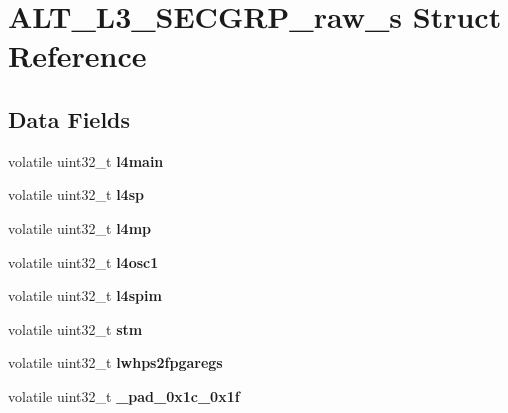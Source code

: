 \hypertarget{structALT__L3__SECGRP__raw__s}{}\section{A\+L\+T\+\_\+\+L3\+\_\+\+S\+E\+C\+G\+R\+P\+\_\+raw\+\_\+s Struct Reference}
\label{structALT__L3__SECGRP__raw__s}
\subsection*{Data Fields}
\begin{DoxyCompactItemize}
\item 
\mbox{\label{structALT__L3__SECGRP__raw__s_a616ddb645c5aa45671cb5f1a06451ca6}} 
volatile uint32\+\_\+t {\bfseries l4main}
\item 
\mbox{\label{structALT__L3__SECGRP__raw__s_a28191747b4a39b26d48e3eddc1559cdb}} 
volatile uint32\+\_\+t {\bfseries l4sp}
\item 
\mbox{\label{structALT__L3__SECGRP__raw__s_a9a12ab088671a91921e2f21f5d0bd70d}} 
volatile uint32\+\_\+t {\bfseries l4mp}
\item 
\mbox{\label{structALT__L3__SECGRP__raw__s_a1f3602186fb653488d9f2be46563f71f}} 
volatile uint32\+\_\+t {\bfseries l4osc1}
\item 
\mbox{\label{structALT__L3__SECGRP__raw__s_a6d47281f0bb0876dd140a32f4af65b26}} 
volatile uint32\+\_\+t {\bfseries l4spim}
\item 
\mbox{\label{structALT__L3__SECGRP__raw__s_add6f9534699f771f55c973afeee2fd0c}} 
volatile uint32\+\_\+t {\bfseries stm}
\item 
\mbox{\label{structALT__L3__SECGRP__raw__s_a3ad3176a3906065aa2d673d09e13cab6}} 
volatile uint32\+\_\+t {\bfseries lwhps2fpgaregs}
\item 
\mbox{\label{structALT__L3__SECGRP__raw__s_a9d39edb7c1daec30a497a2acea2805c9}} 
volatile uint32\+\_\+t {\bfseries \+\_\+pad\+\_\+0x1c\+\_\+0x1f}

\end{DoxyCompactItemize}
